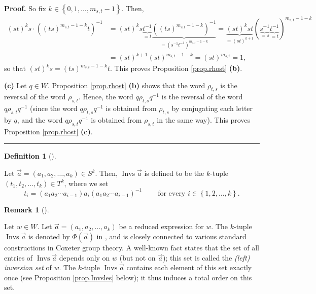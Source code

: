 \documentclass
[numbers=enddot,12pt,final,onecolumn,notitlepage,abstracton]{scrartcl}%
\theoremstyle{definition}
\newtheorem{defi}[theo]{Definition}
\newenvironment{definition}[1][]
{\begin{defi}[#1]\begin{leftbar}}
{\end{leftbar}\end{defi}}
\newtheorem{remk}[theo]{Remark}
\newenvironment{remark}[1][]
{\begin{remk}[#1]\begin{leftbar}}
{\end{leftbar}\end{remk}}
\newenvironment{proof}[1][Proof]{\noindent\textbf{#1.} }{\ \rule{0.5em}{0.5em}}
\begin{document}
\begin{proof}
So fix $k\in\left\{  0,1,\ldots,m_{s,t}-1\right\}  $. Then,%
\begin{align*}
\left(  st\right)  ^{k}s\cdot\left(  \left(  ts\right)  ^{m_{s,t}%
-1-k}t\right)  ^{-1}  &  =\left(  st\right)  ^{k}s\underbrace{t^{-1}}%
_{=t}\underbrace{\left(  \left(  ts\right)  ^{m_{s,t}-1-k}\right)  ^{-1}%
}_{=\left(  s^{-1}t^{-1}\right)  ^{m_{s,t}-1-k}}=\underbrace{\left(
st\right)  ^{k}st}_{=\left(  st\right)  ^{k+1}}\left(  \underbrace{s^{-1}%
}_{=s}\underbrace{t^{-1}}_{=t}\right)  ^{m_{s,t}-1-k}\\
&  =\left(  st\right)  ^{k+1}\left(  st\right)  ^{m_{s,t}-1-k}=\left(
st\right)  ^{m_{s,t}}=1,
\end{align*}
so that $\left(  st\right)  ^{k}s=\left(  ts\right)  ^{m_{s,t}-1-k}t$. This
proves Proposition \ref{prop.rhost} \textbf{(b)}. \medskip

\textbf{(c)} Let $q\in W$. Proposition \ref{prop.rhost} \textbf{(b)} shows
that the word $\rho_{t,s}$ is the reversal of the word $\rho_{s,t}$. Hence,
the word $q\rho_{t,s}q^{-1}$ is the reversal of the word $q\rho_{s,t}q^{-1}$
(since the word $q\rho_{t,s}q^{-1}$ is obtained from $\rho_{t,s}$ by
conjugating each letter by $q$, and the word $q\rho_{s,t}q^{-1}$ is obtained
from $\rho_{s,t}$ in the same way). This proves Proposition \ref{prop.rhost}
\textbf{(c)}.
\end{proof}

\begin{definition}
\label{def.Invsle}Let $\overrightarrow{a}=\left(  a_{1},a_{2},\ldots
,a_{k}\right)  \in S^{k}$. Then, $\operatorname*{Invs}\overrightarrow{a}$ is
defined to be the $k$-tuple $\left(  t_{1},t_{2},\ldots,t_{k}\right)  \in
T^{k}$, where we set%
\[
t_{i}=\left(  a_{1}a_{2}\cdots a_{i-1}\right)  a_{i}\left(  a_{1}a_{2}\cdots
a_{i-1}\right)  ^{-1}\ \ \ \ \ \ \ \ \ \ \text{for every }i\in\left\{
1,2,\ldots,k\right\}  .
\]

\end{definition}

\begin{remark}
Let $w\in W$. Let $\overrightarrow{a}=\left(  a_{1},a_{2},\ldots,a_{k}\right)
$ be a reduced expression for $w$. The $k$-tuple $\operatorname*{Invs}%
\overrightarrow{a}$ is denoted by $\Phi\left(  \overrightarrow{a}\right)  $ in
\cite[Chapter 4, n$^{\circ}$ 1.4]{Bourbaki4-6}, and is closely connected to
various standard constructions in Coxeter group theory. A well-known fact
states that the set of all entries of $\operatorname*{Invs}\overrightarrow{a}$
depends only on $w$ (but not on $\overrightarrow{a}$); this set is called the
\emph{(left) inversion set} of $w$. The $k$-tuple $\operatorname*{Invs}%
\overrightarrow{a}$ contains each element of this set exactly once (see
Proposition \ref{prop.Invsles} below); it thus induces a total order on this set.
\end{remark}
\end{document}
